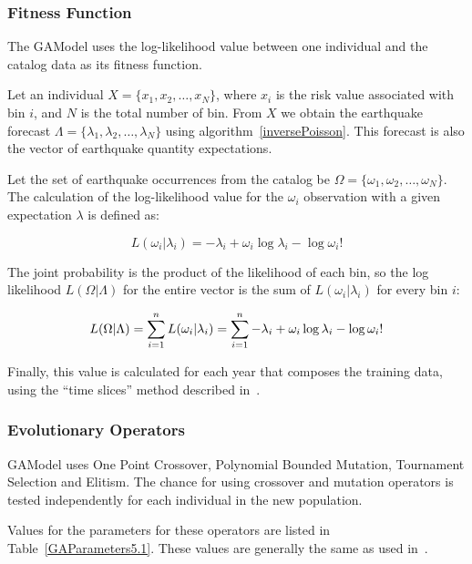 \subsubsection*{Fitness Function}

The GAModel uses the log-likelihood value between one individual
and the catalog data as its fitness function.

Let an individual $X = \{x_1, x_2, \ldots, x_N\}$, where $x_i$ is the
risk value associated with bin $i$, and $N$ is the total number of
bin. From $X$ we obtain the earthquake forecast $\Lambda =
\{\lambda_1, \lambda_2, \ldots, \lambda_N\}$ using
algorithm~\ref{inversePoisson}. This forecast is also the vector of
earthquake quantity expectations.

Let the set of earthquake occurrences from the catalog be $\Omega =
\{\omega_1, \omega_2, \ldots, \omega_N\}$. The calculation of the
log-likelihood value for the $\omega_i$ observation with a given
expectation $\lambda$ is defined as:

\begin{equation}
L(\omega_i|\lambda_i) = -\lambda_i + \omega_i\log\lambda_i - \log\omega_i!
\end{equation}

The joint probability is the product of the likelihood of each bin, so
the log likelihood $L(\Omega|\Lambda)$ for the entire vector is the
sum of $L(\omega_i|\lambda_i)$ for every bin $i$:

\begin{equation}
L(\Omega|\Lambda) = \sum_{i=1}^{n}L(\omega_i|\lambda_i) \\ =
\sum_{i=1}^{n} -\lambda_i + \omega_i\log\lambda_i - \log\omega_i!
\end{equation}

Finally, this value is calculated for each year that composes the
training data, using the ``time slices'' method described
in~\cite{ecta14}.


\subsubsection*{Evolutionary Operators}\label{gaOperators}

GAModel uses One Point Crossover, Polynomial Bounded Mutation,
Tournament Selection and Elitism. The chance for using crossover and
mutation operators is tested independently for each individual in the
new population.

Values for the parameters for these operators are listed in
Table~\ref{GAParameters5.1}. These values are generally the same as
used in~\cite{ecta14}.

